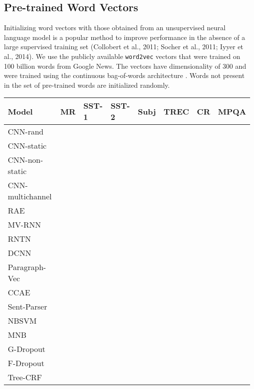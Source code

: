 \documentclass[11pt]{article}
\begin{document}
\subsection{Pre-trained Word Vectors}
Initializing word vectors with those obtained from an unsupervised neural language model is a popular method to improve performance in the absence of a large supervised training set (Collobert et al., 2011; Socher et al., 2011; Iyyer et al., 2014). We use the publicly available \texttt{word2vec} vectors that were trained on 100 billion words from Google News. The vectors have dimensionality of 300 and were trained using the continuous bag-of-words architecture \cite{Mikolov:2013}. Words not present in the set of pre-trained words are initialized randomly.
\begin{table*}[ht]
\center
\begin{tabular}{>{\arraybackslash}m{5.95cm} ||>{\centering\arraybackslash}m{0.9cm}|>{\centering\arraybackslash}m{0.95cm}| >{\centering\arraybackslash}m{0.95cm}| >{\centering\arraybackslash}m{0.9cm}| >{\centering\arraybackslash}m{0.9cm}| >{\centering\arraybackslash}m{0.9cm}| >{\centering\arraybackslash}m{0.9cm}  }
\hline
\textbf{Model} & MR & SST-1 & SST-2 & Subj & TREC & CR & MPQA \\ \hline
CNN-rand &  &  &  &  &  & & \\ 
CNN-static &  &  &  &  &  & & \\ 
CNN-non-static &  &  &  &  &  & & \\ 
CNN-multichannel &  &  &  &  &  & & \\  \hline
RAE \cite{Socher:2011} &  &  &  &  &  &  & \\
MV-RNN \cite{Socher:2012} &  &  &  &  & & &  \\
RNTN \cite{Socher:2013} &  &  &  &  & & & \\
DCNN \cite{Kalch:2014} &  & &  &  &  & &  \\
Paragraph-Vec \cite{Le:2014} &  & &  &  &  & &  \\
CCAE \cite{Hermann:2013} &  &  &  &  &  & & \\
Sent-Parser \cite{Dong:2014} &  &  &  &  &  &  & \\
NBSVM \cite{Wang:2012} &  &  &  &  &  & &  \\
MNB \cite{Wang:2012} &  &  &  &  &  & &  \\
G-Dropout \cite{Wang:2013} &  &  &  &  &  & &  \\
F-Dropout \cite{Wang:2013} &  &  &  &  &  & &  \\
Tree-CRF \cite{Nakagawa:2010} &  &  &  &  &  & &  \\

\end{tabular}
\end{table*}
\end{document}
